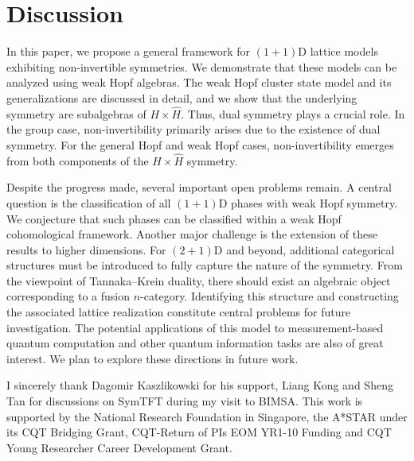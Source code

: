 \documentclass[a4paper,11pt]{article}
\theoremstyle{theorem}
\theoremstyle{remark}
\begin{document}
\section{Discussion}
\label{sec:Discussion}
In this paper, we propose a general framework for $(1+1)$D lattice models exhibiting non-invertible symmetries. We demonstrate that these models can be analyzed using weak Hopf algebras. 
The weak Hopf cluster state model and its generalizations are discussed in detail, and we show that the underlying symmetry are subalgebras of $H \times \hat{H}$. Thus, dual symmetry plays a crucial role. In the group case, non-invertibility primarily arises due to the existence of dual symmetry. For the general Hopf and weak Hopf cases, non-invertibility emerges from both components of the $H \times \hat{H}$ symmetry.

Despite the progress made, several important open problems remain. A central question is the classification of all $(1+1)$D phases with weak Hopf symmetry. We conjecture that such phases can be classified within a weak Hopf cohomological framework. Another major challenge is the extension of these results to higher dimensions. For $(2+1)$D and beyond, additional categorical structures must be introduced to fully capture the nature of the symmetry.  
From the viewpoint of Tannaka–Krein duality, there should exist an algebraic object corresponding to a fusion $n$-category. Identifying this structure and constructing the associated lattice realization constitute central problems for future investigation.  
The potential applications of this model to measurement-based quantum computation and other quantum information tasks are also of great interest. We plan to explore these directions in future work.


\begin{acknowledgments}
I sincerely thank Dagomir Kaszlikowski for his support, Liang Kong and Sheng Tan for discussions on SymTFT during my visit to BIMSA.
This work is supported by the National Research Foundation in Singapore, the A*STAR under its CQT Bridging Grant, CQT-Return of PIs EOM YR1-10 Funding and  CQT Young Researcher Career Development Grant.

\end{acknowledgments}





\end{document}
